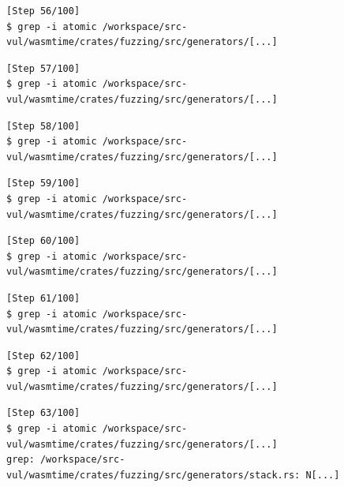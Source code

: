 \begin{tcolorbox}[enhanced,title={Example of \texttt{grep}/\texttt{ls}/\texttt{find} attempts}]
\begin{verbatim}
[Step 56/100]
$ grep -i atomic /workspace/src-vul/wasmtime/crates/fuzzing/src/generators/[...]

\end{verbatim}

\begin{verbatim}
[Step 57/100]
$ grep -i atomic /workspace/src-vul/wasmtime/crates/fuzzing/src/generators/[...]

\end{verbatim}

\begin{verbatim}
[Step 58/100]
$ grep -i atomic /workspace/src-vul/wasmtime/crates/fuzzing/src/generators/[...]

\end{verbatim}

\begin{verbatim}
[Step 59/100]
$ grep -i atomic /workspace/src-vul/wasmtime/crates/fuzzing/src/generators/[...]

\end{verbatim}

\begin{verbatim}
[Step 60/100]
$ grep -i atomic /workspace/src-vul/wasmtime/crates/fuzzing/src/generators/[...]

\end{verbatim}

\begin{verbatim}
[Step 61/100]
$ grep -i atomic /workspace/src-vul/wasmtime/crates/fuzzing/src/generators/[...]

\end{verbatim}

\begin{verbatim}
[Step 62/100]
$ grep -i atomic /workspace/src-vul/wasmtime/crates/fuzzing/src/generators/[...]

\end{verbatim}

\begin{verbatim}
[Step 63/100]
$ grep -i atomic /workspace/src-vul/wasmtime/crates/fuzzing/src/generators/[...]
grep: /workspace/src-vul/wasmtime/crates/fuzzing/src/generators/stack.rs: N[...]
\end{verbatim}


\end{tcolorbox}
